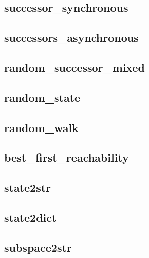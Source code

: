 \documentclass[letterpaper,10pt,english]{sphinxmanual}
\begin{document}
\subsection{successor\_synchronous}
\label{StateTransitionGraphs:id3}\label{StateTransitionGraphs:successor-synchronous}

\subsection{successors\_asynchronous}
\label{StateTransitionGraphs:successors-asynchronous}\label{StateTransitionGraphs:id4}

\subsection{random\_successor\_mixed}
\label{StateTransitionGraphs:random-successor-mixed}\label{StateTransitionGraphs:successor-random-mixed}

\subsection{random\_state}
\label{StateTransitionGraphs:id5}\label{StateTransitionGraphs:random-state}

\subsection{random\_walk}
\label{StateTransitionGraphs:id6}\label{StateTransitionGraphs:random-walk}

\subsection{best\_first\_reachability}
\label{StateTransitionGraphs:id7}\label{StateTransitionGraphs:best-first-reachability}

\subsection{state2str}
\label{StateTransitionGraphs:state2str}\label{StateTransitionGraphs:id8}

\subsection{state2dict}
\label{StateTransitionGraphs:state2dict}\label{StateTransitionGraphs:id9}

\subsection{subspace2str}
\label{StateTransitionGraphs:id10}\label{StateTransitionGraphs:subspace2str}
\end{document}
